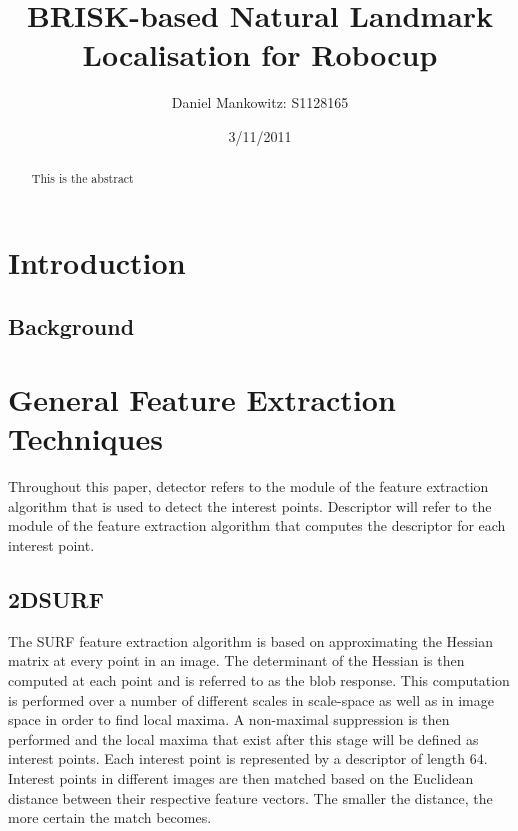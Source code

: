 \documentclass{article}
\title{BRISK-based Natural Landmark Localisation for Robocup}
\author{Daniel Mankowitz: S1128165}
\date{3/11/2011}
\begin{document}
\maketitle

\newpage
\begin{abstract}
This is the abstract
\end{abstract}

\section{Introduction}
\label{sec:introduction}

\subsection{Background}
\label{sec:background}

\section{General Feature Extraction Techniques}
\label{sec:genFeatureExtract}
Throughout this paper, detector refers to the module of the feature extraction algorithm that is used to detect the interest points. Descriptor will refer to the module of the feature extraction algorithm that computes the descriptor for each interest point.\\

\subsection{2DSURF}
\label{sec:2dsurf}
The SURF feature extraction algorithm is based on approximating the Hessian matrix at every point in an image. The determinant of the Hessian is then computed at each point and is referred to as the blob response. This computation is performed over a number of different scales in scale-space as well as in image space in order to find local maxima. A non-maximal suppression is then performed and the local maxima that exist after this stage will be defined as interest points. Each interest point is represented by a descriptor of length $64$. Interest points in different images are then matched based on the Euclidean distance between their respective feature vectors. The smaller the distance, the more certain the match becomes. 
\end{document}
